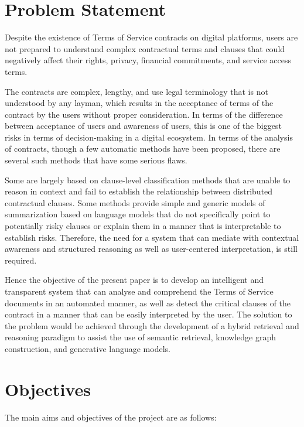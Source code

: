 \section{Problem Statement}
Despite the existence of Terms of Service contracts on digital
platforms, users are not prepared to understand complex contractual
terms and clauses that could negatively affect their rights, privacy,
financial commitments, and service access terms.

The contracts are complex, lengthy, and use legal terminology that is not understood by any layman,
which results in the acceptance of terms of the contract by the users without proper consideration.
In terms of the difference between acceptance of users and awareness of users, this is one of the biggest
risks in terms of decision-making in a digital ecosystem.
In terms of the analysis of contracts, though a few automatic methods have been proposed, there are
several such methods that have some serious flaws.

Some are largely based on clause-level classification methods that are unable to reason in context and fail to
establish the relationship between distributed contractual clauses.
Some methods provide simple and generic models of summarization based on language models that do not
specifically point to potentially risky clauses or explain them in a manner that is interpretable to establish risks.
Therefore, the need for a system that can mediate with contextual awareness and structured reasoning as well as
user-centered interpretation, is still required.

Hence the objective of the present paper is to develop an intelligent and transparent system that can analyse and comprehend the Terms of Service documents in an automated manner, as well as detect the critical clauses of the contract in a manner that can be easily interpreted by the user.
The solution to the problem would be achieved through the development of a hybrid retrieval and reasoning paradigm to assist the use of semantic retrieval, knowledge graph construction, and generative language models.


\section{Objectives}
The main aims and objectives of the project are as follows:

